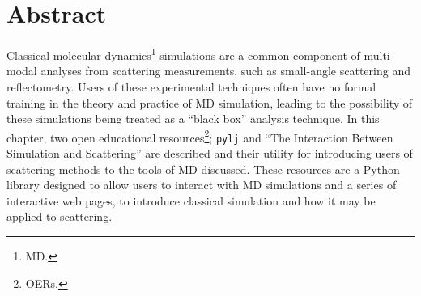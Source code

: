 \section*{Abstract}
Classical molecular dynamics\footnote{MD.} simulations are a common component of multi-modal analyses from scattering measurements, such as small-angle scattering and reflectometry.
Users of these experimental techniques often have no formal training in the theory and practice of MD simulation, leading to the possibility of these simulations being treated as a ``black box'' analysis technique.
In this chapter, two open educational resources\footnote{OERs.}; \texttt{pylj} and ``The Interaction Between Simulation and Scattering'' are described and their utility for introducing users of scattering methods to the tools of MD discussed.
These resources are a Python library designed to allow users to interact with MD simulations and a series of interactive web pages, to introduce classical simulation and how it may be applied to scattering.
